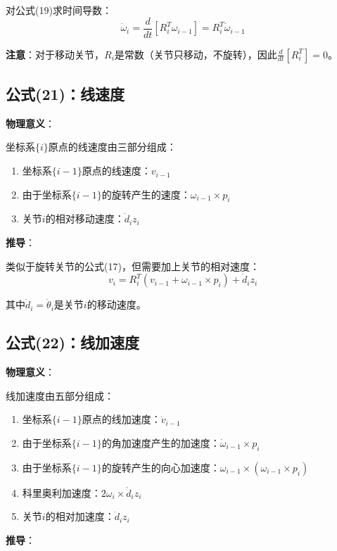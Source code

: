 \documentclass[12pt,a4paper]{article}
\begin{document}
对公式(19)求时间导数：
\begin{equation}
\dot{\omega}_i = \frac{d}{dt}[R_i^T \omega_{i-1}] = R_i^T \dot{\omega}_{i-1} \tag{20}
\end{equation}

\textbf{注意}：对于移动关节，$R_i$是常数（关节只移动，不旋转），因此$\frac{d}{dt}[R_i^T] = 0$。

\subsection{公式(21)：线速度}

\textbf{物理意义}：

坐标系$\{i\}$原点的线速度由三部分组成：
\begin{enumerate}
\item 坐标系$\{i-1\}$原点的线速度：$v_{i-1}$
\item 由于坐标系$\{i-1\}$的旋转产生的速度：$\omega_{i-1} \times p_i$
\item 关节$i$的相对移动速度：$\dot{d}_i z_i$
\end{enumerate}

\textbf{推导}：

类似于旋转关节的公式(17)，但需要加上关节的相对速度：
\begin{equation}
v_i = R_i^T (v_{i-1} + \omega_{i-1} \times p_i) + \dot{d}_i z_i \tag{21}
\end{equation}

其中$\dot{d}_i = \dot{\theta}_i$是关节$i$的移动速度。

\subsection{公式(22)：线加速度}

\textbf{物理意义}：

线加速度由五部分组成：
\begin{enumerate}
\item 坐标系$\{i-1\}$原点的线加速度：$\dot{v}_{i-1}$
\item 由于坐标系$\{i-1\}$的角加速度产生的加速度：$\dot{\omega}_{i-1} \times p_i$
\item 由于坐标系$\{i-1\}$的旋转产生的向心加速度：$\omega_{i-1} \times (\omega_{i-1} \times p_i)$
\item 科里奥利加速度：$2\omega_i \times \dot{d}_i z_i$
\item 关节$i$的相对加速度：$\ddot{d}_i z_i$
\end{enumerate}

\textbf{推导}：
\end{document}
